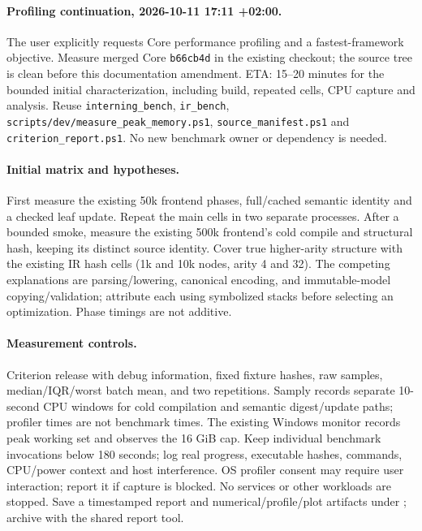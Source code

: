 \documentclass[11pt,a4paper]{article}
\begin{document}
\paragraph{Profiling continuation, 2026-10-11 17:11 +02:00.}
The user explicitly requests Core performance profiling and a fastest-framework
objective. Measure merged Core \texttt{b66cb4d} in the existing checkout; the source
tree is clean before this documentation amendment. ETA: 15--20 minutes for the
bounded initial characterization, including build, repeated cells, CPU capture and
analysis. Reuse \texttt{interning\_bench}, \texttt{ir\_bench},
\texttt{scripts/dev/measure\_peak\_memory.ps1}, \texttt{source\_manifest.ps1}
and \texttt{criterion\_report.ps1}. No new benchmark owner or dependency is needed.

\paragraph{Initial matrix and hypotheses.} First measure the existing 50k frontend
phases, full/cached semantic identity and a checked leaf update. Repeat the main
cells in two separate processes. After a bounded smoke, measure the existing
500k frontend's cold compile and structural hash, keeping its distinct source
identity. Cover true higher-arity structure with the existing IR hash cells
(1k and 10k nodes, arity 4 and 32). The competing explanations are parsing/lowering,
canonical encoding, and immutable-model copying/validation; attribute each using
symbolized stacks before selecting an optimization. Phase timings are not additive.

\paragraph{Measurement controls.} Criterion release with debug information, fixed
fixture hashes, raw samples, median/IQR/worst batch mean, and two repetitions.
Samply records separate 10-second CPU windows for cold compilation and semantic
digest/update paths; profiler times are not benchmark times. The existing Windows
monitor records peak working set and observes the 16 GiB cap. Keep individual
benchmark invocations below 180 seconds; log real progress, executable hashes,
commands, CPU/power context and host interference. OS profiler consent may require
user interaction; report it if capture is blocked. No services or other workloads
are stopped. Save a timestamped report and numerical/profile/plot artifacts under
; archive with the shared report tool.
\end{document}
